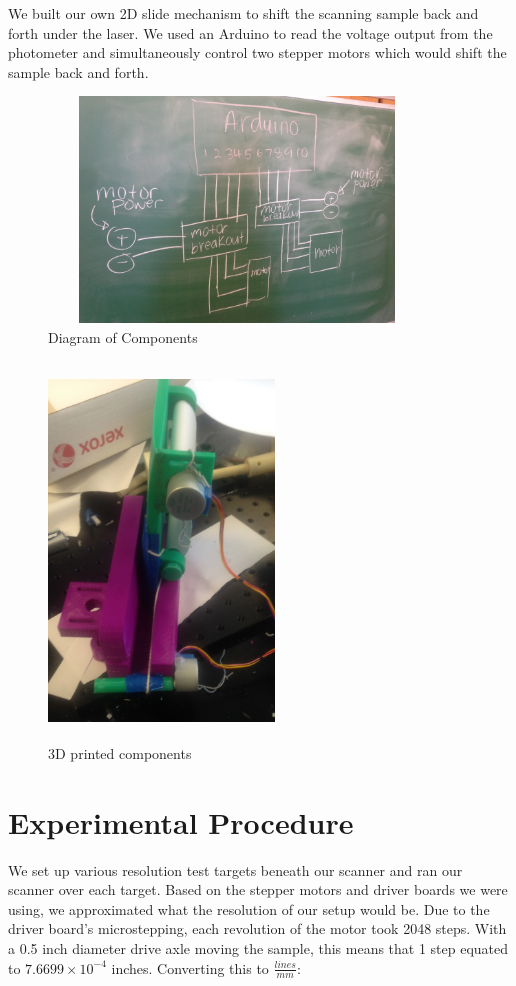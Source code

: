 \documentclass[letterpaper, 12pt]{article}
\begin{document}
\par
We built our own 2D slide mechanism to shift the scanning sample back and forth under the laser. We used an Arduino to read the voltage output from the photometer and simultaneously control two stepper motors which would shift the sample back and forth.

\begin{figure}[H]
  \centering
  \includegraphics[width=10cm,height=6cm]{circuit}
  \caption{Diagram of Components}
\end{figure}

\begin{figure}[H]
  \centering
  \includegraphics[width=6cm,height=10cm]{setup}
  \caption[caption]{3D printed components\footnotemark}
\end{figure}

\section{Experimental Procedure}
\par
We set up various resolution test targets beneath our scanner and ran our scanner over each target. Based on the stepper motors\footnotemark
{}
and driver boards\footnotemark
{}
we were using, we approximated what the resolution of our setup would be. Due to the driver board's microstepping, each revolution of the motor took 2048 steps. With a 0.5 inch diameter drive axle moving the sample, this means that 1 step equated to $7.6699\times10^{-4}$ inches. Converting this to $ \frac{lines}{mm}$:
\end{document}
